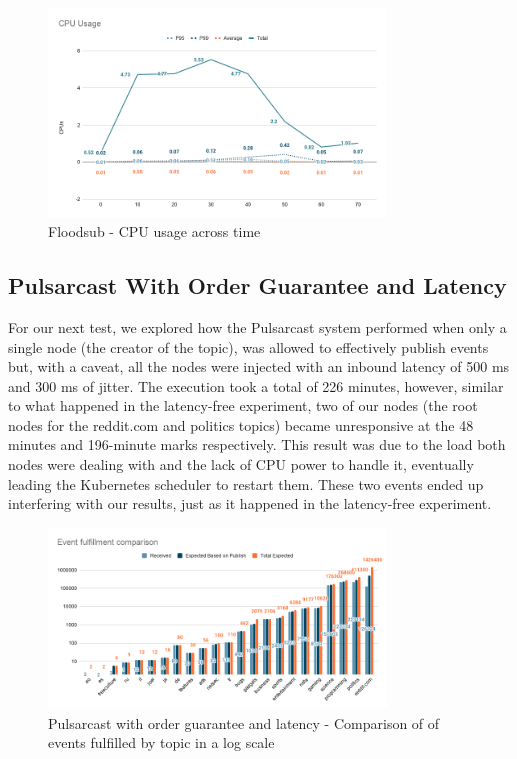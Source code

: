 \begin{figure}[!htb]
  \centering
  \includegraphics[width=0.8\textwidth]{img/graph-floodsub-cpu.png}
  \caption{Floodsub - CPU usage across time}
  \label{fig:graph-floodsub-cpu}
\end{figure}

\subsection{Pulsarcast With Order Guarantee and Latency}\label{subsec:pulsarcast-with-order-guarantee-and-latency}

For our next test, we explored how the Pulsarcast system performed when only a
single node (the creator of the topic), was allowed to effectively publish
events but, with a caveat, all the nodes were injected with an inbound latency
of 500 ms and 300 ms of jitter. The execution took a total of 226 minutes,
however, similar to what happened in the latency-free experiment, two of our
nodes (the root nodes for the reddit.com and politics topics) became
unresponsive at the 48 minutes and 196-minute marks respectively. This result
was due to the load both nodes were dealing with and the lack of CPU power to
handle it, eventually leading the Kubernetes scheduler to restart them. These
two events ended up interfering with our results, just as it happened in the
latency-free experiment.

\begin{figure}[!htb]
  \centering
  \includegraphics[width=0.8\textwidth]{img/graph-pulsarcast-order-latency-event-fulfillment-comparison.png}
  \caption{Pulsarcast with order guarantee and latency - Comparison of of events fulfilled by topic in a log scale}
  \label{fig:graph-pulsarcast-order-latency-event-fulfillment-comparison}
\end{figure}


